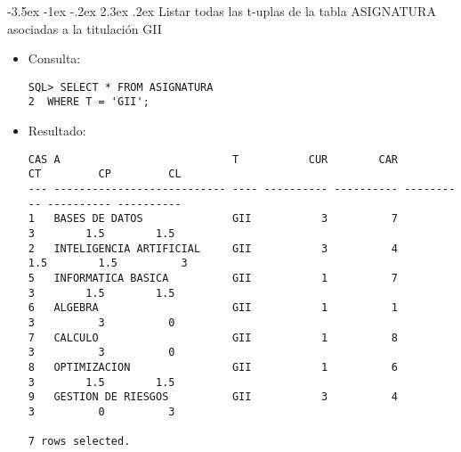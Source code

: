 \documentclass[11pt]{report}
\makeatletter
\renewcommand\chapter{\@startsection{chapter}{0}{\z@}%
    {-3.5ex \@plus -1ex \@minus -.2ex}%
    {2.3ex \@plus.2ex}%
    {\normalfont\Large\bfseries}}
\makeatother
\begin{document}
\chapter{Listar todas las t-uplas de la tabla ASIGNATURA asociadas a la titulación GII}
\begin{itemize}
  \item Consulta:
  \begin{verbatim}
SQL> SELECT * FROM ASIGNATURA
2  WHERE T = 'GII';
  \end{verbatim}
  \item{Resultado:}
  \begin{verbatim}
CAS A                           T           CUR        CAR         CT         CP         CL                                                                               
--- --------------------------- ---- ---------- ---------- ---------- ---------- ----------                                                                               
1   BASES DE DATOS              GII           3          7          3        1.5        1.5                                                                               
2   INTELIGENCIA ARTIFICIAL     GII           3          4        1.5        1.5          3                                                                               
5   INFORMATICA BASICA          GII           1          7          3        1.5        1.5                                                                               
6   ALGEBRA                     GII           1          1          3          3          0                                                                               
7   CALCULO                     GII           1          8          3          3          0                                                                               
8   OPTIMIZACION                GII           1          6          3        1.5        1.5                                                                               
9   GESTION DE RIESGOS          GII           3          4          3          0          3                                                                                 

7 rows selected.
  \end{verbatim}
\end{itemize}

\end{document}

